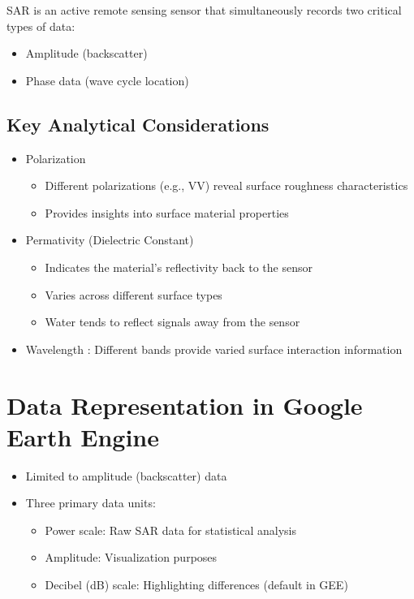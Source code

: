 \documentclass[
  letterpaper,
]{scrbook}
\begin{document}
SAR is an active remote sensing sensor that simultaneously records two
critical types of data:

\begin{itemize}
\item
  Amplitude (backscatter)
\item
  Phase data (wave cycle location)
\end{itemize}

\subsection{Key Analytical
Considerations}\label{key-analytical-considerations}

\begin{itemize}
\item
  Polarization

  \begin{itemize}
  \item
    Different polarizations (e.g., VV) reveal surface roughness
    characteristics
  \item
    Provides insights into surface material properties
  \end{itemize}
\item
  Permativity (Dielectric Constant)

  \begin{itemize}
  \item
    Indicates the material's reflectivity back to the sensor
  \item
    Varies across different surface types
  \item
    Water tends to reflect signals away from the sensor
  \end{itemize}
\item
  Wavelength : Different bands provide varied surface interaction
  information
\end{itemize}

\section{Data Representation in Google Earth
Engine}\label{data-representation-in-google-earth-engine}

\begin{itemize}
\item
  Limited to amplitude (backscatter) data
\item
  Three primary data units:

  \begin{itemize}
  \item
    Power scale: Raw SAR data for statistical analysis
  \item
    Amplitude: Visualization purposes
  \item
    Decibel (dB) scale: Highlighting differences (default in GEE)
  \end{itemize}
\end{itemize}
\end{document}
